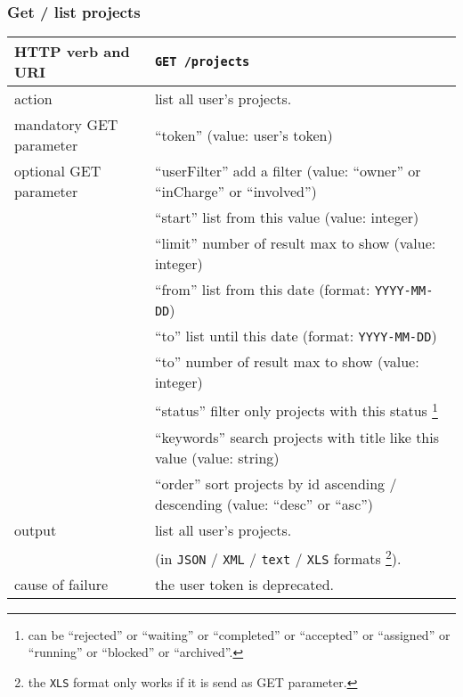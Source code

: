 \subsubsection{Get / list projects}
\begin{tabular}{ | l | l | }
	\hline
	HTTP verb and URI & \texttt{GET /projects} \\
	\hline
	action & list all user's projects. \\
	\hline
	mandatory GET parameter & ``token'' (value: user's token) \\
	\hline
	optional GET parameter & ``userFilter'' add a filter (value: ``owner'' or ``inCharge'' or ``involved'') \\
	\space & ``start'' list from this value (value: integer) \\
	\space & ``limit'' number of result max to show (value: integer) \\
	\space & ``from'' list from this date (format: \texttt{YYYY-MM-DD}) \\
	\space & ``to'' list until this date (format: \texttt{YYYY-MM-DD}) \\
	\space & ``to'' number of result max to show (value: integer) \\
	\space & ``status'' filter only projects with this status \footnote{can be ``rejected'' or ``waiting'' or ``completed'' or ``accepted'' or ``assigned'' or ``running'' or ``blocked'' or ``archived''. } \\
	\space & ``keywords'' search projects with title like this value (value: string) \\
	\space & ``order'' sort projects by id ascending / descending (value: ``desc'' or ``asc'')  \\
	\hline
	output & list all user's projects.  \\
	\space & (in \texttt{JSON} / \texttt{XML} / \texttt{text} / \texttt{XLS} formats \footnote{the \texttt{XLS} format only works if it is send as GET parameter.}). \\
	\hline
	cause of failure & the user token is deprecated. \\
	\hline
\end{tabular}
\newline

